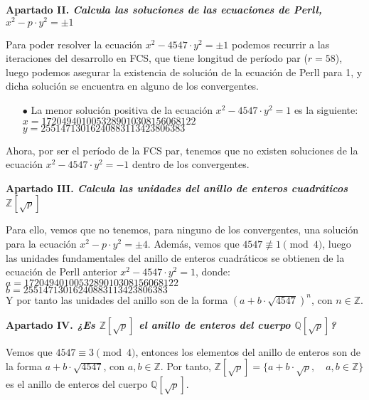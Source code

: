 \documentclass[fleqn]{article}
\def\Z{\mathds{Z}}
\def\Q{\mathds{Q}}
\begin{document}
    \newpage
    \textbf{Apartado II. \textit{Calcula las soluciones de las ecuaciones de Perll, $x^2 - p \cdot y^2 = \pm 1$}}

    Para poder resolver la ecuación $x^2 - 4547 \cdot y^2 = \pm 1$ podemos recurrir a las iteraciones del desarrollo en FCS, que tiene 
    longitud de período par ($r = 58$), luego podemos asegurar la existencia de solución de la ecuación de Perll para 1, y dicha solución 
    se encuentra en alguno de los convergentes.

    \begin{enumerate}
        \item[$\bullet$] La menor solución positiva de la ecuación $x^2 - 4547 \cdot y^2 = 1$ es la siguiente: \\
                        $x = 1720494010053289010308156068122$ \\
                        $y = 25514713016240883113423806383$ 
    \end{enumerate}

    Ahora, por ser el período de la FCS par, tenemos que no existen soluciones de la ecuación $x^2 - 4547 \cdot y^2 = - 1$ 
    dentro de los convergentes.

    \newpage
    \textbf{Apartado III. \textit{Calcula las unidades del anillo de enteros cuadráticos $\Z[\sqrt{p}]$}}

    Para ello, vemos que no tenemos, para ninguno de los convergentes, una solución para la ecuación $x^2 - p \cdot y^2 = \pm 4$. 
    Además, vemos que $4547 \not\equiv 1 \pmod{4}$, luego las unidades fundamentales del anillo de enteros cuadráticos se obtienen 
    de la ecuación de Perll anterior $x^2 - 4547 \cdot y^2 = 1$, donde:\\
    $a = 1720494010053289010308156068122$ \\
    $b = 25514713016240883113423806383$ \\
        
    Y por tanto las unidades del anillo son de la forma $(a + b \cdot \sqrt{4547})^n$, con $n \in \Z$.

    \newpage
    \textbf{Apartado IV. \textit{¿Es $\Z[\sqrt{p}]$ el anillo de enteros del cuerpo $\Q[\sqrt{p}]$?}}

    Vemos que $4547 \equiv 3 \pmod{4}$, entonces los elementos del anillo de enteros son de la forma $a + b \cdot \sqrt{4547}$, con $a,b \in \Z$.
    Por tanto, $\Z[\sqrt{p}] = \{a + b\cdot \sqrt{p}, \quad a,b \in \Z \}$ es el anillo de enteros del cuerpo $\Q[\sqrt{p}]$.
\end{document}
